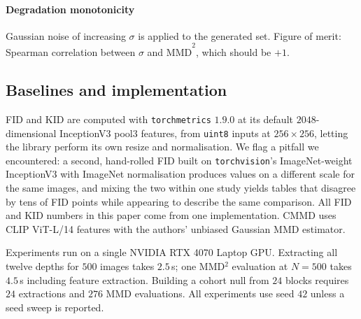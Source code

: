 \documentclass[preprint,12pt,authoryear]{elsarticle}
\newcommand{\mmd}{\mathrm{MMD}}
\begin{document}
\paragraph{Degradation monotonicity}
Gaussian noise of increasing $\sigma$ is applied to the generated set. Figure of
merit: Spearman correlation between $\sigma$ and $\widehat{\mmd}^2$, which
should be $+1$.

\subsection{Baselines and implementation}
\label{sec:baselines}

FID and KID are computed with \texttt{torchmetrics} $1.9.0$ at its default
$2048$-dimensional InceptionV3 pool3 features, from \texttt{uint8} inputs at
$256\times256$, letting the library perform its own resize and normalisation.
We flag a pitfall we encountered: a second, hand-rolled FID built on
\texttt{torchvision}'s ImageNet-weight InceptionV3 with ImageNet normalisation
produces values on a different scale for the same images, and mixing the two
within one study yields tables that disagree by tens of FID points while
appearing to describe the same comparison. All FID and KID numbers in this paper
come from one implementation. CMMD \citep{jayasumana2024cmmd} uses CLIP
ViT-L/14 features with the authors' unbiased Gaussian MMD estimator.

Experiments run on a single NVIDIA RTX 4070 Laptop GPU. Extracting all twelve
depths for $500$ images takes $2.5$\,s; one MMD$^2$ evaluation at $N=500$ takes
$4.5$\,s including feature extraction. Building a cohort null from $24$ blocks
requires $24$ extractions and $276$ MMD evaluations. All experiments use seed
$42$ unless a seed sweep is reported.










\end{document}
